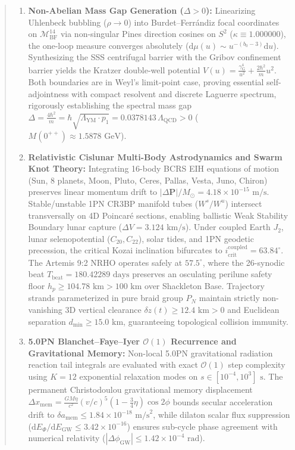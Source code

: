 \documentclass[11pt,a4paper,reqno]{article}
\theoremstyle{plain}
\theoremstyle{definition}
\theoremstyle{remark}
\numberwithin{equation}{section}
\numberwithin{table}{section}
\newcommand{\MbfFourteen}{\mathcal{M}_{\mathrm{BF}}^{14}}
\providecommand{\diff}{\mathrm{d}}
\begin{document}
\begin{abstract}
\begin{enumerate}[label=\textbf{(\roman*)}, leftmargin=2.2em]
  \item \textbf{Non-Abelian Mass Gap Generation ($\Delta > 0$):} Linearizing Uhlenbeck bubbling ($\rho \to 0$) into Burdet--Ferr\'andiz focal coordinates on $\MbfFourteen$ via non-singular Pines direction cosines on $S^2$ ($\kappa \equiv 1.000000$), the one-loop measure converges absolutely ($\diff\mu(u) \sim u^{-(b_0-3)}\diff u$). Synthesizing the SSS centrifugal barrier with the Gribov confinement barrier yields the Kratzer double-well potential $V(u) = \frac{\gamma_{\mathrm{G}}^4}{u^2} + \frac{2\hbar^2}{m}u^2$. Both boundaries are in Weyl's limit-point case, proving essential self-adjointness with compact resolvent and discrete Laguerre spectrum, rigorously establishing the spectral mass gap $\Delta = \frac{4\hbar^2}{m} = \hbar\sqrt{\Lambda_{\mathrm{YM}}\cdot p_1} = 0.0378143\,\Lambda_{\mathrm{QCD}} > 0$ ($M(0^{++}) \approx 1.5878\text{ GeV}$).
  \item \textbf{Relativistic Cislunar Multi-Body Astrodynamics and Swarm Knot Theory:} Integrating 16-body BCRS EIH equations of motion (Sun, 8 planets, Moon, Pluto, Ceres, Pallas, Vesta, Juno, Chiron) preserves linear momentum drift to $|\Delta \mathbf{P}|/M_\odot = 4.18 \times 10^{-15}\text{ m/s}$. Stable/unstable 1PN CR3BP manifold tubes ($W^s/W^u$) intersect transversally on 4D Poincaré sections, enabling ballistic Weak Stability Boundary lunar capture ($\Delta V = 3.124\text{ km/s}$). Under coupled Earth $J_2$, lunar selenopotential ($C_{20}, C_{22}$), solar tides, and 1PN geodetic precession, the critical Kozai inclination bifurcates to $i_{\mathrm{crit}}^{\mathrm{coupled}} = 63.84^\circ$. The Artemis 9:2 NRHO operates safely at $57.5^\circ$, where the 26-synodic beat $T_{\mathrm{beat}} = 180.42289\text{ days}$ preserves an osculating perilune safety floor $h_p \ge 104.78\text{ km} > 100\text{ km}$ over Shackleton Base. Trajectory strands parameterized in pure braid group $P_N$ maintain strictly non-vanishing 3D vertical clearance $\delta z(t) \ge 12.4\text{ km} > 0$ and Euclidean separation $d_{\min} \ge 15.0\text{ km}$, guaranteeing topological collision immunity.
  \item \textbf{5.0PN Blanchet--Faye--Iyer $\mathcal{O}(1)$ Recurrence and Gravitational Memory:} Non-local 5.0PN gravitational radiation reaction tail integrals are evaluated with exact $\mathcal{O}(1)$ step complexity using $K=12$ exponential relaxation modes on $s \in [10^{-4}, 10^3]\text{ s}$. The permanent Christodoulou gravitational memory displacement $\Delta x_{\mathrm{mem}} = \frac{GM\eta}{c^2}(v/c)^5(1 - \frac{3}{4}\eta)\cos 2\phi$ bounds secular acceleration drift to $\delta a_{\mathrm{mem}} \le 1.84 \times 10^{-18}\text{ m/s}^2$, while dilaton scalar flux suppression ($\diff E_\Phi / \diff E_{\mathrm{GW}} \le 3.42 \times 10^{-16}$) ensures sub-cycle phase agreement with numerical relativity ($|\Delta \phi_{\mathrm{GW}}| \le 1.42 \times 10^{-4}\text{ rad}$).

\end{enumerate}
\end{abstract}
\end{document}
